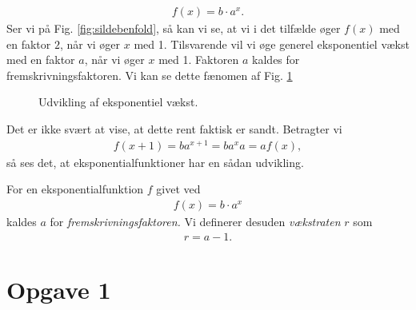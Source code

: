 \begin{align*}
f(x) = b\cdot a^x.
\end{align*}
Ser vi på Fig. \ref{fig:sildebenfold}, så kan vi se, at vi i det tilfælde øger $f(x)$ med en faktor $2$, når vi øger $x$ med 1. Tilsvarende vil vi øge generel eksponentiel vækst med en faktor $a$, når vi øger $x$ med 1. Faktoren $a$ kaldes for fremskrivningsfaktoren. Vi kan se dette fænomen af Fig. \ref{fig:sildegen}
\begin{figure}[H]
\center
{}
\caption{Udvikling af eksponentiel vækst.}
\label{fig:sildegen}
\end{figure}
Det er ikke svært at vise, at dette rent faktisk er sandt. Betragter vi
\begin{align*}
f(x+1) = ba^{x+1} = ba^xa = af(x),
\end{align*}
så ses det, at eksponentialfunktioner har en sådan udvikling. 
\begin{defn}
	For en eksponentialfunktion $f$ givet ved
	\begin{align*}
		f(x) = b\cdot a^x
	\end{align*}
	kaldes $a$ for \textit{fremskrivningsfaktoren.}
	Vi definerer desuden \textit{vækstraten} $r$ som
	\begin{align*}
		r = a -1.
	\end{align*}
\end{defn}

\section*{Opgave 1}


